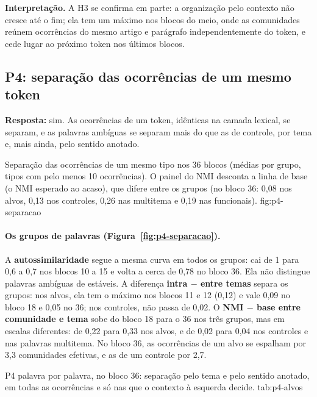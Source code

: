\textbf{Interpretação.} A H3 se confirma em parte: a organização pelo contexto não
cresce até o fim; ela tem um máximo nos blocos do meio, onde as comunidades reúnem ocorrências
do mesmo artigo e parágrafo independentemente do token, e cede lugar ao próximo token nos
últimos blocos.

\subsection{P4: separação das ocorrências de um mesmo token}\label{sec:res-p4}

\textbf{Resposta:} sim. As ocorrências de um token, idênticas na camada lexical, se separam, e
as palavras ambíguas se separam mais do que as de controle, por tema e, mais ainda, pelo
sentido anotado.

    {Separação das ocorrências de um mesmo tipo nos 36 blocos (médias por grupo, tipos com pelo
    menos 10 ocorrências). O painel do NMI desconta a linha de base (o NMI esperado ao acaso),
    que difere entre os grupos (no bloco 36: 0,08 nos alvos, 0,13 nos controles, 0,26 nas
    multitema e 0,19 nas funcionais).}
    {fig:p4-separacao}

\paragraph{Os grupos de palavras (Figura~\ref{fig:p4-separacao}).} A
\textbf{autossimilaridade} segue a mesma curva em todos os grupos: cai de 1 para 0,6 a 0,7 nos
blocos 10 a 15 e volta a cerca de 0,78 no bloco 36. Ela não distingue palavras ambíguas de
estáveis. A diferença \textbf{intra $-$ entre temas}
separa os grupos: nos alvos, ela tem o máximo nos blocos 11 e 12 (0,12) e vale 0,09 no bloco 18
e 0,05 no 36; nos controles, não passa de 0,02. O \textbf{NMI $-$ base entre comunidade e tema}
sobe do bloco 18 para o 36 nos três grupos, mas em escalas diferentes: de 0,22 para 0,33 nos
alvos, e de 0,02 para 0,04 nos controles e nas palavras multitema. No bloco 36, as ocorrências de um alvo se espalham por 3,3 comunidades efetivas, e as
de um controle por 2,7.

    {P4 palavra por palavra, no bloco 36: separação pelo tema e pelo sentido anotado, em todas
    as ocorrências e só nas que o contexto à esquerda decide.}
    {tab:p4-alvos}

